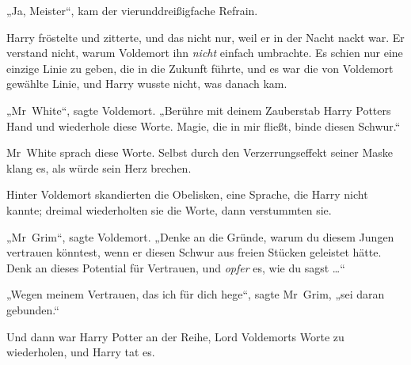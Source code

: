 „Ja, Meister“, kam der vierunddreißigfache Refrain.

Harry fröstelte und zitterte, und das nicht nur, weil er in der Nacht nackt war. Er verstand nicht, warum Voldemort ihn \emph{nicht} einfach umbrachte. Es schien nur eine einzige Linie zu geben, die in die Zukunft führte, und es war die von Voldemort gewählte Linie, und Harry wusste nicht, was danach kam.

„Mr~White“, sagte Voldemort.
„Berühre mit deinem Zauberstab Harry Potters Hand und wiederhole diese Worte. Magie, die in mir fließt, binde diesen Schwur.“

Mr~White sprach diese Worte. Selbst durch den Verzerrungseffekt seiner Maske klang es, als würde sein Herz brechen.

Hinter Voldemort skandierten die Obelisken, eine Sprache, die Harry nicht kannte; dreimal wiederholten sie die Worte, dann verstummten sie.

„Mr~Grim“, sagte Voldemort.
„Denke an die Gründe, warum du diesem Jungen vertrauen könntest, wenn er diesen Schwur aus freien Stücken geleistet hätte. Denk an dieses Potential für Vertrauen, und \emph{opfer} es, wie du sagst …“

„Wegen meinem Vertrauen, das ich für dich hege“, sagte Mr~Grim, „sei daran gebunden.“

Und dann war Harry Potter an der Reihe, Lord Voldemorts Worte zu wiederholen, und Harry tat es.


